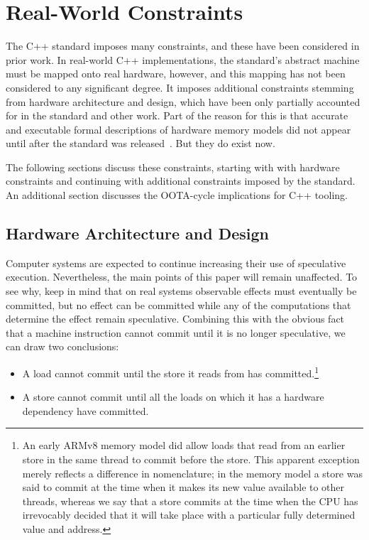 \documentclass[10]{article}
\begin{document}
\section{Real-World Constraints}
\label{sec:Real-World Constraints}

The C++ standard imposes many constraints, and these have been considered
in prior work.
In real-world C++ implementations, the standard's
abstract machine must be mapped onto real hardware, however, and
this mapping has not been considered to any significant degree.
It imposes additional constraints stemming from hardware architecture and
design,
which have been only partially accounted for in the standard and other work.
Part of the reason for this is
that accurate and executable formal descriptions of hardware memory
models did not appear until after the standard was
released~\cite{JadeAlglave2011ppcmem,Maranget2012TutorialARMPower}.
But they do exist now.

The following sections discuss these constraints, starting with with
hardware constraints and continuing with additional constraints imposed
by the standard.
An additional section discusses the OOTA-cycle implications for C++
tooling.

\subsection{Hardware Architecture and Design}
\label{sec:Hardware Architecture and Design}

Computer systems are expected to continue increasing their use of
speculative execution.
Nevertheless, the main points of this paper will remain unaffected.
To see why, keep in mind that on real systems observable effects
must eventually be committed, but no effect can be committed
while any of the computations that determine the effect remain
speculative.
Combining this with the obvious fact that a machine instruction cannot
commit until it is no longer speculative, we can draw two conclusions:
\begin{itemize}
\item	A load cannot commit until the store it reads from has
	committed.\footnote{
	An early ARMv8 memory model did allow loads that read from an
	earlier store in the same thread to commit before the store.
	This apparent exception merely reflects a difference in
	nomenclature; in the memory model a store was said to commit at
	the time when it makes its new value available to other
	threads, whereas we say that a store commits at the time when
	the CPU has irrevocably decided that it will take place with a
	particular fully determined value and address.}
\item	A store cannot commit until all the loads on which it has a
	hardware dependency have committed.
\end{itemize}
\end{document}
